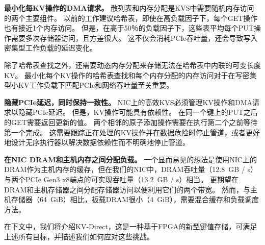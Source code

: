 \textbf {最小化每KV操作的DMA请求。}
散列表和内存分配是KVS中需要随机内存访问的两个主要组件。
以前的工作建议哈希表\cite {dragojevic2014farm,breslow2016horton}，即使在高负载因子下，每个GET操作也有接近1个内存访问。
但是，在高于50％的负载因子下，这些表平均每个PUT操作需要多次存储器访问，且方差很大。
这不仅会消耗PCIe吞吐量，还会导致写入密集型工作负载的延迟变化。

除了哈希表查找之外，还需要动态内存分配来存储无法在哈希表中内联的可变长度KV。
最小化每个KV操作的哈希表查找和每个内存分配的内存访问对于在写密集型小KV工作负载下匹配PCIe和网络吞吐量至关重要。

\textbf {隐藏PCIe延迟，同时保持一致性。}
NIC上的高效KVS必须管理KV操作和DMA请求以隐藏PCIe延迟。
但是，KV操作可能具有依赖性。
在同一个键上的PUT之后的GET需要返回更新的值。
两个相邻的原子添加操作需要在执行第二个之前等待第一个完成。
这需要跟踪正在处理的KV操作并在数据危险时停止管道，或者更好地设计无序执行器以解决数据依赖性而不明确地停止管道。


\textbf {在NIC DRAM和主机内存之间分配负载。}
一个显而易见的想法是使用NIC上的DRAM作为主机内存的缓存，但在我们的NIC中，DRAM吞吐量（12.8~GB / s）与两个PCIe Gen3 x8端点的可实现吞吐量（13.2~GB / s）相当。 
更期望在DRAM和主机存储器之间分配存储器访问以便利用它们的两个带宽。
然而，与主机存储器（64~GiB）相比，板载DRAM很小（4~GiB），需要混合缓存和负载调度方法。

在下文中，我们将介绍KV-Direct，这是一种基于FPGA的新型键值存储，可满足上述所有目标，并描述我们如何应对这些挑战。